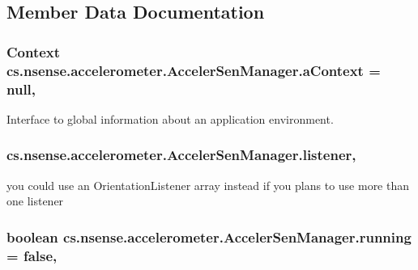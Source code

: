 \subsection{Member Data Documentation}
\hypertarget{classcs_1_1nsense_1_1accelerometer_1_1_acceler_sen_manager_ab69ade607ca050ba47e3ef89a316606a}{
\subsubsection[{a\-Context}]{\setlength{\rightskip}{0pt plus 5cm}Context cs.\-nsense.\-accelerometer.\-Acceler\-Sen\-Manager.\-a\-Context = null\hspace{0.3cm}{\ttfamily [static]}, {\ttfamily [private]}}}\label{classcs_1_1nsense_1_1accelerometer_1_1_acceler_sen_manager_ab69ade607ca050ba47e3ef89a316606a}
Interface to global information about an application environment. \hypertarget{classcs_1_1nsense_1_1accelerometer_1_1_acceler_sen_manager_a5ffa2f553d7ceb1ff3f0d14d55498aee}{
\subsubsection[{listener}]{ cs.\-nsense.\-accelerometer.\-Acceler\-Sen\-Manager.\-listener\hspace{0.3cm}{\ttfamily [static]}, {\ttfamily [private]}}}\label{classcs_1_1nsense_1_1accelerometer_1_1_acceler_sen_manager_a5ffa2f553d7ceb1ff3f0d14d55498aee}
you could use an Orientation\-Listener array instead if you plans to use more than one listener \hypertarget{classcs_1_1nsense_1_1accelerometer_1_1_acceler_sen_manager_a6f293390a67a02d2c126a71e162349b4}{
\subsubsection[{running}]{\setlength{\rightskip}{0pt plus 5cm}boolean cs.\-nsense.\-accelerometer.\-Acceler\-Sen\-Manager.\-running = false\hspace{0.3cm}{\ttfamily [static]}, {\ttfamily [private]}}}\label{classcs_1_1nsense_1_1accelerometer_1_1_acceler_sen_manager_a6f293390a67a02d2c126a71e162349b4}
